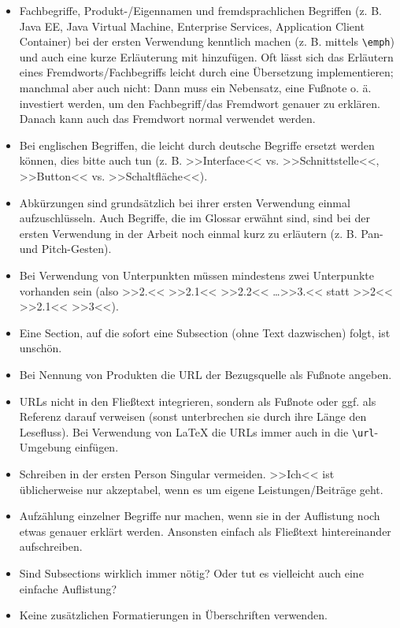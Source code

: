\begin{itemize}
\item Fachbegriffe, Produkt-/Eigennamen und fremdsprachlichen Begriffen (z. B. Java EE, Java Virtual Machine, Enterprise Services, Application Client Container) bei der ersten Verwendung kenntlich machen (z. B. mittels \verb|\emph|) und auch eine kurze Erläuterung mit hinzufügen. Oft lässt sich das Erläutern eines Fremdworts/Fachbegriffs leicht durch eine Übersetzung implementieren; manchmal aber auch nicht: Dann muss ein Nebensatz, eine Fußnote o. ä. investiert werden, um den Fachbegriff/das Fremdwort genauer zu erklären. Danach kann auch das Fremdwort normal verwendet werden.
\item Bei englischen Begriffen, die leicht durch deutsche Begriffe ersetzt werden können, dies bitte auch tun (z. B. >>Interface<< vs. >>Schnittstelle<<, >>Button<< vs. >>Schaltfläche<<).
\item Abkürzungen sind grundsätzlich bei ihrer ersten Verwendung einmal aufzuschlüsseln. Auch Begriffe, die im Glossar erwähnt sind, sind bei der ersten Verwendung in der Arbeit noch einmal kurz zu erläutern (z. B. Pan- und Pitch-Gesten).
\item Bei Verwendung von Unterpunkten müssen mindestens zwei Unterpunkte vorhanden sein (also >>2.<< >>2.1<< >>2.2<< \ldots >>3.<< statt >>2<< >>2.1<< >>3<<).
\item Eine Section, auf die sofort eine Subsection (ohne Text dazwischen) folgt, ist unschön.
\item Bei Nennung von Produkten die URL der Bezugsquelle als Fußnote angeben.
\item URLs nicht in den Fließtext integrieren, sondern als Fußnote oder ggf. als Referenz darauf verweisen (sonst unterbrechen sie durch ihre Länge den Lesefluss). Bei Verwendung von LaTeX die URLs immer auch in die \verb|\url|-Umgebung einfügen.
\item Schreiben in der ersten Person Singular vermeiden. >>Ich<< ist üblicherweise nur akzeptabel, wenn es um eigene Leistungen/Beiträge geht.
\item Aufzählung einzelner Begriffe nur machen, wenn sie in der Auflistung noch etwas genauer erklärt werden. Ansonsten einfach als Fließtext hintereinander aufschreiben.
\item Sind Subsections wirklich immer nötig? Oder tut es vielleicht auch eine einfache Auflistung?
\item Keine zusätzlichen Formatierungen in Überschriften verwenden.
\end{itemize}




